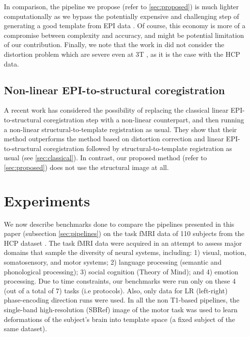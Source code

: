 
In comparison, the pipeline we propose (refer to \ref{sec:proposed})
is much lighter computationally as
we bypass the potentially expensive and challenging step of generating a good
template from EPI data \citep{pmid17354756}. Of course, this economy is
more of a compromise between complexity and accuracy, and might be potential
limitation of our
contribution.  Finally, we note that the work in \citep{grabner2014}
did not consider the distortion problem which are severe even at 3T
\citep{anderson2003}, as it is the case with the HCP data.

\subsection{Non-linear EPI-to-structural coregistration}
A recent work \citep{wang2017} has considered the possibility of replacing the classical
linear EPI-to-structural coregistration step with a non-linear counterpart,
and then running a non-linear structural-to-template registration as usual.
They show that their method outperforms the method based on distortion correction
and linear EPI-to-structural coregistration followed by structural-to-template
registration as usual (see \ref{sec:classical}). In contrast, our proposed
method (refer to \ref{sec:proposed}) does not use the structural image at all.


\section{Experiments}
\label{sec:exp_epi2epi}
We now describe benchmarks done to compare the pipelines presented in
this paper (subsection \ref{sec:pipelines}) on the task fMRI data of
110 subjects from the HCP dataset \citep{VanEssen20122222}. 
The task fMRI data were acquired in an attempt to assess major domains
that
sample the diversity of neural systems, including: 1) visual, motion,
somatosensory, and motor systems; 2) language processing (semantic and
phonological processing); 3) social cognition (Theory of Mind); and 4)
emotion processing.
Due to time constraints, our benchmarks were run only on these 4 (out
of a total of 7) tasks (i.e protocols). Also, only data for LR (left-right)
phase-encoding direction \citep{chang1992technique} runs were used. In all the non T1-based
pipelines, the single-band high-resolution (SBRef) image of the motor
task was used to learn deformations of the subject's brain into
template space (a fixed subject of the same dataset).

